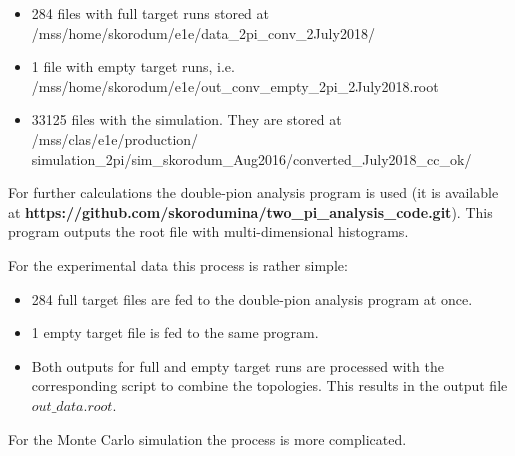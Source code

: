 \begin{itemize}
\item 284 files with full target runs stored at\\[-0.75mm] 
/mss/home/skorodum/e1e/data\_2pi\_conv\_2July2018/\vspace{-0.7em}
\item 1 file with empty target runs, i.e.\\[-0.75mm]
/mss/home/skorodum/e1e/out\_conv\_empty\_2pi\_2July2018.root \vspace{-0.7em}
\item 33125 files with the simulation. They are stored at /mss/clas/e1e/production/\\[-0.75mm]
simulation\_2pi/sim\_skorodum\_Aug2016/converted\_July2018\_cc\_ok/
\vspace{-0.5em}
\end{itemize}


For further calculations the double-pion analysis program is used (it is available at {\bf https://github.com/skorodumina/two\_pi\_analysis\_code.git}). This program outputs the root file with multi-dimensional histograms.

For the experimental data this process is rather simple:\vspace{-1em}

\begin{itemize}

\item 284 full target files are fed to the double-pion analysis program at once. \vspace{-0.7em}
\item 1 empty target file is fed to the same program. \vspace{-0.7em}
\item Both outputs for full and empty target runs are processed with the corresponding script to combine the topologies. This results in the output file $out\_data.root$. \vspace{-0.5em}

\end{itemize}



For the Monte Carlo simulation the process is more complicated.\vspace{-1em}

